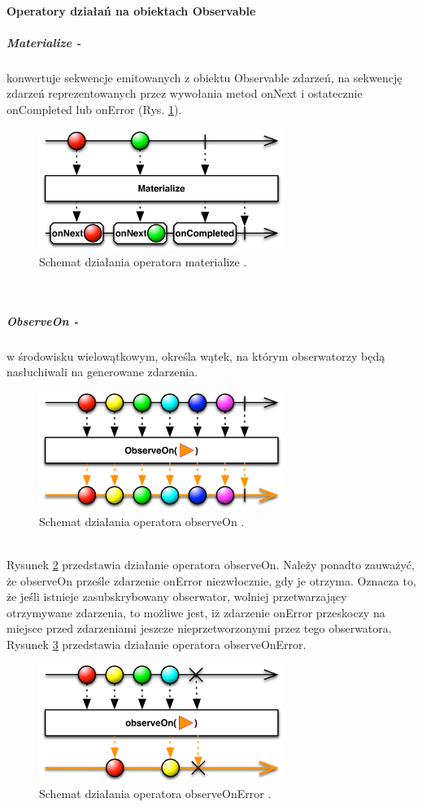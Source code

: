 \documentclass[12pt,oneside,a4paper]{report}
\begin{document}
\paragraph{Operatory działań na obiektach Observable}
\subparagraph{Materialize -}konwertuje sekwencje emitowanych z obiektu Observable zdarzeń, na sekwencję zdarzeń reprezentowanych przez wywołania metod onNext i ostatecznie onCompleted lub onError (Rys. \ref{materialize}).
\begin{figure}[ht!]
	\centering
	\includegraphics[width=8cm]{materialize}
	\caption{Schemat działania operatora  materialize \cite{operators}.}
	\label{materialize}
\end{figure}\\
\subparagraph{ObserveOn -}w środowisku wielowątkowym, określa wątek, na którym obserwatorzy będą nasłuchiwali na generowane zdarzenia. 
\begin{figure}[ht!]
	\centering
	\includegraphics[width=8cm]{observeOn}
	\caption{Schemat działania operatora observeOn \cite{operators}.}
	\label{observeOn}
\end{figure}\\
Rysunek \ref{observeOn} przedstawia działanie operatora observeOn.
Należy ponadto zauważyć, że observeOn prześle zdarzenie onError niezwłocznie, gdy je otrzyma. Oznacza to, że jeśli istnieje zasubskrybowany obserwator, wolniej przetwarzający otrzymywane zdarzenia, to możliwe jest, iż zdarzenie onError przeskoczy na miejsce przed zdarzeniami jeszcze nieprzetworzonymi przez tego obserwatora. Rysunek \ref{observeOnError} przedstawia działanie operatora observeOnError.
\begin{figure}[ht!]
	\centering
	\includegraphics[width=8cm]{observeOnError}
	\caption{Schemat działania operatora observeOnError \cite{operators}.}
	\label{observeOnError}
\end{figure}\\
\end{document}
